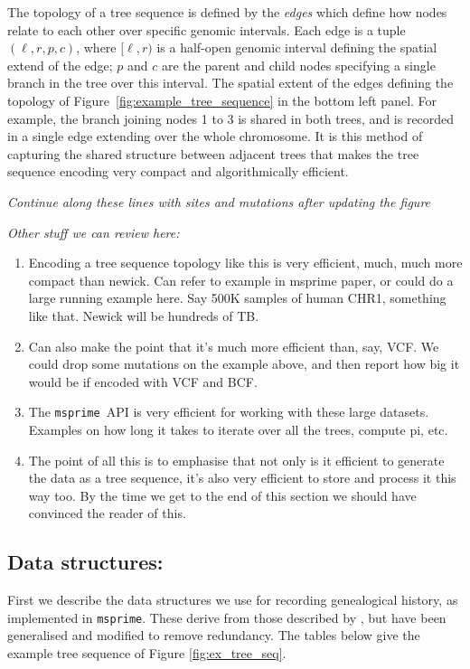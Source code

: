 \documentclass{article}
\newcommand{\msprime}{\texttt{msprime}}
\newcommand{\jk}[1]{{\em \color{red} #1}}
\begin{document}
The topology of a tree sequence is defined by the \emph{edges} which define how
nodes relate to each other over specific genomic intervals. Each edge is a tuple
$(\ell, r, p, c)$, where $[\ell, r)$ is a half-open genomic interval defining the
spatial extend of the edge; $p$ and $c$ are the parent and child nodes specifying
a single branch in the tree over this interval. The spatial extent of the
edges defining the topology of Figure~\ref{fig:example_tree_sequence} in the
bottom left panel. For example, the branch joining nodes 1 to 3 is shared in both trees,
and is recorded in a single edge extending over the whole chromosome. It is this
method of capturing the shared structure between adjacent trees that makes the
tree sequence encoding very compact and algorithmically efficient.

\jk{Continue along these lines with sites and mutations after updating the figure}

\jk{Other stuff we can review here:}
\begin{enumerate}
\item Encoding a tree sequence topology like this is very efficient, much, much more compact than newick.
Can refer to example in msprime paper, or could do a large running example here. Say 500K samples of
human CHR1, something like that. Newick will be hundreds of TB.

\item Can also make the point that it's much more efficient than, say, VCF. We could drop some
mutations on the example above, and then report how big it would be if encoded with VCF and BCF.

\item The \msprime\ API is very efficient for working with these large datasets. Examples on
how long it takes to iterate over all the trees, compute pi, etc.

\item The point of all this is to emphasise that not only is it efficient to generate the
data as a tree sequence, it's also very efficient to store and process it this way too. By the
time we get to the end of this section we should have convinced the reader of this.

\end{enumerate}


\subsection*{Data structures:}

First we describe the data structures we use for recording genealogical history,
as implemented in \msprime.
These derive from those described by \citet{kelleher2016efficient},
but have been generalised and modified to remove redundancy.
The tables below give the example tree sequence of Figure \ref{fig:ex_tree_seq}.
\end{document}
